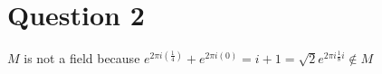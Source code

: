 \section*{Question 2}
$ M $ is not a field because $ e^{2 \pi i \left(\frac{1}{4}\right)} + e^{2 \pi i (0)} = i + 1 = \sqrt{2} e^{2 \pi i \frac{1}{8} i} \notin M $